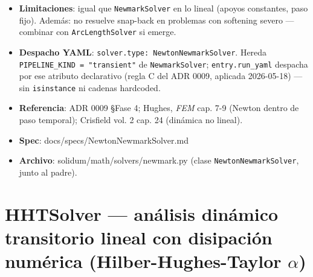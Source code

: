 \documentclass[11pt,letterpaper,oneside]{report}
\begin{document}
\begin{itemize}
  \item \textbf{Limitaciones}: igual que \texttt{NewmarkSolver} en lo lineal (apoyos constantes, paso fijo). Además: no resuelve snap-back en problemas con softening severo --- combinar con \texttt{ArcLengthSolver} si emerge.
  \item \textbf{Despacho YAML}: \texttt{solver.type: NewtonNewmarkSolver}. Hereda \texttt{PIPELINE\_KIND = "transient"} de \texttt{NewmarkSolver}; \texttt{entry.run\_yaml} despacha por ese atributo declarativo (regla C del ADR 0009, aplicada 2026-05-18) --- sin \texttt{isinstance} ni cadenas hardcoded.
  \item \textbf{Referencia}: ADR 0009 §Fase 4; Hughes, \textit{FEM} cap. 7-9 (Newton dentro de paso temporal); Crisfield vol. 2 cap. 24 (dinámica no lineal).
  \item \textbf{Spec}: docs/specs/NewtonNewmarkSolver.md
  \item \textbf{Archivo}: solidum/math/solvers/newmark.py (clase \texttt{NewtonNewmarkSolver}, junto al padre).
\end{itemize}


\section{HHTSolver --- análisis dinámico transitorio lineal con disipación numérica (Hilber-Hughes-Taylor \ensuremath{\alpha})}
\end{document}
